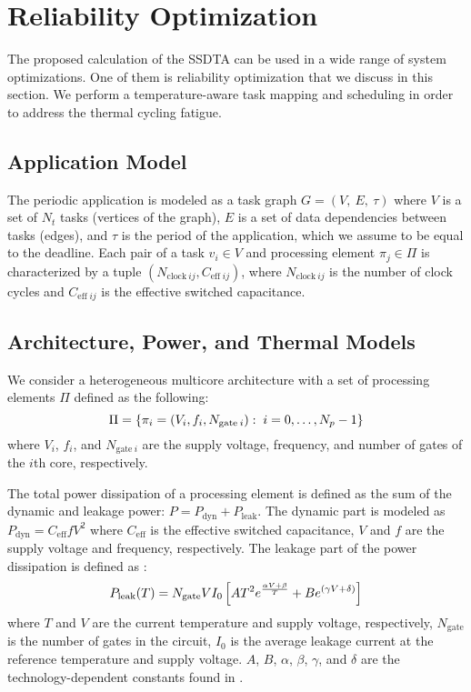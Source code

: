 \section{Reliability Optimization} 

The proposed calculation of the SSDTA can be used in a wide range of system
optimizations. One of them is reliability optimization that we discuss in this
section. We perform a temperature-aware task mapping and scheduling in order to
address the thermal cycling fatigue.

\subsection{Application Model} 

The periodic application is modeled as a task graph $G = (V, \: E, \: \tau)$
where $V$ is a set of $N_t$ tasks (vertices of the graph), $E$ is a set of data
dependencies between tasks (edges), and $\tau$ is the period of the application,
which we assume to be equal to the deadline. Each pair of a task $v_i \in V$ and
processing element $\pi_j \in \Pi$ is characterized by a tuple $(N_{\text{clock}
\: ij}, C_{\text{eff} \; ij})$, where $N_{\text{clock} \: ij}$ is the number of
clock cycles and $C_{\text{eff} \; ij}$ is the effective switched capacitance.

\subsection{Architecture, Power, and Thermal Models}   

We consider a heterogeneous multicore architecture with a set of processing
elements $\Pi$ defined as the following:
\[
  \Pi = \{ \pi_i = (V_i, f_i, N_{\text{gate} \: i}): \; i = 0, \dots, N_p - 1 \}
\]
where $V_i$, $f_i$, and $N_{\text{gate} \: i}$ are the supply voltage,
frequency, and number of gates \cite{liao2005} of the $i$th core, respectively.

The total power dissipation of a processing element is defined as the sum of the
dynamic and leakage power: $P = P_\text{dyn} + P_\text{leak}$. The dynamic part
is modeled as $P_\text{dyn} = C_\text{eff} f V^2$ where $C_\text{eff}$ is the
effective switched capacitance, $V$ and $f$ are the supply voltage and
frequency, respectively. The leakage part of the power dissipation is defined as
\cite{liao2005}:
\begin{equation} \elab{total-power}
  P_\text{leak}(T) = N_\text{gate} V I_0 \left[ A T^2 e^{\frac{\alpha V + \beta}{T}} + B e^{(\gamma V + \delta)} \right]
\end{equation}
where $T$ and $V$ are the current temperature and supply voltage, respectively,
$N_\text{gate}$ is the number of gates in the circuit, $I_0$ is the average
leakage current at the reference temperature and supply voltage. $A$, $B$,
$\alpha$, $\beta$, $\gamma$, and $\delta$ are the technology-dependent constants
found in \cite{liao2005}.

